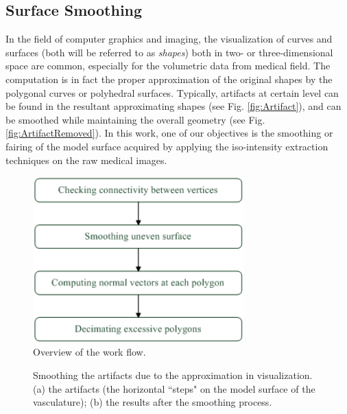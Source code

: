 \subsection{Surface Smoothing}

In the field of computer graphics and imaging, the visualization of curves and surfaces (both will be referred to as \emph{shapes}) both in two- or three-dimensional space are common, especially for the volumetric data from medical field. %
The computation is in fact the proper approximation of the original shapes by the polygonal curves or polyhedral surfaces.
Typically, artifacts at certain level can be found in the resultant approximating shapes (see Fig. \ref{fig:Artifact}), and can be smoothed while maintaining the overall geometry (see Fig. \ref{fig:ArtifactRemoved}). %
In this work, one of our objectives is the smoothing or fairing of the model surface acquired by applying the iso-intensity extraction techniques on the raw medical images.
\begin{figure}[t]
\centering
\includegraphics[width=3.2in]{Figures/DataFlow4.png}
\caption{Overview of the work flow.}
\label{fig:DataFlow}
\end{figure}
\begin{figure}[t]
\centering
{}
\hfil
{}
\caption{Smoothing the artifacts due to the approximation in visualization. (a) the artifacts (the horizontal ``steps" on the model surface of the vasculature); (b) the results after the smoothing process.}%
\label{fig:ArtifactComparison}
\end{figure}
